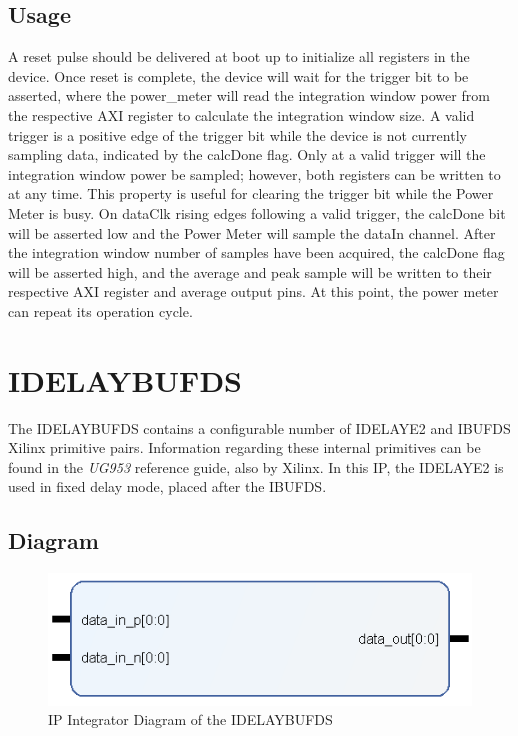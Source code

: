 \documentclass[11pt]{article}
\begin{document}
\subsection{Usage}
A reset pulse should be delivered at boot up to initialize all registers in the device. Once reset is complete, the device will wait for the trigger bit
to be asserted, where the power\_meter will read the integration window power from the respective AXI register to calculate the integration window size.
A valid trigger is a positive edge of the trigger bit while the device is not currently sampling data, indicated by the calcDone flag. Only at a valid 
trigger will the integration window power be sampled; however, both registers can be written to at any time. This property is useful for clearing the
trigger bit while the Power Meter is busy.\hfill\break
On dataClk rising edges following a valid trigger, the calcDone bit will be asserted low and the Power Meter
will sample the dataIn channel. After the integration window number of samples have been acquired, the calcDone flag will be asserted high, and
the average and peak sample will be written to their respective AXI register and average output pins. At this point, the power meter can repeat its
operation cycle. 

\section{IDELAYBUFDS}
The IDELAYBUFDS contains a configurable number of IDELAYE2 and IBUFDS Xilinx primitive pairs. Information regarding these internal primitives can be found
in the \textit{UG953} reference guide, also by Xilinx. In this IP, the IDELAYE2 is used in fixed delay mode, placed after the IBUFDS.
\subsection{Diagram}
\begin{figure} [h!]
	\label{fig:IDELAYBUFDS}
	\centering
	\includegraphics[width=0.6\linewidth]{images/IDELAYBUFDS}
	\caption{IP Integrator Diagram of the IDELAYBUFDS}	
\end{figure}
\end{document}
